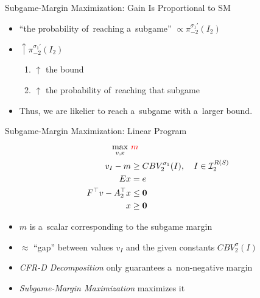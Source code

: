 \documentclass{beamer}
\theoremstyle{definition}
\newcommand{\vect}[1]{\boldsymbol{#1}}
\newcommand{\I}{\mathcal{I}}
\begin{document}
{\begin{frame}{Subgame-Margin Maximization: Gain Is Proportional to SM}
      \begin{itemize}[<+- | alert@+>]
         \item ``the probability of~reaching a~subgame'' $\propto \pi_{-2}^{\sigma_1'}(I_2)$
         \item $\uparrow \pi_{-2}^{\sigma_1'}(I_2)$
           \begin{enumerate}[$\Rightarrow$]
             \item $\uparrow$ the bound
             \item $\uparrow$ the probability of~reaching that subgame
           \end{enumerate}
         \item Thus, we are likelier to reach a~subgame with a~larger bound.
      \end{itemize}
    \end{frame}

    \begin{frame}{Subgame-Margin Maximization: Linear Program}
      \begin{equation*}
        \label{lp:max-margin}
        \begin{split}
          \max_{v, x}\ &\textcolor{red}{m} \\
          v_I - m &\ge CBV_2^{\sigma_1}(I), \quad I \in \I_2^{R(S)}\\ 
          Ex &= e \\
          F^\top v - A_2^\top x &\le \vect{0} \\
          x &\ge \vect{0}
        \end{split}
      \end{equation*}
      \pause

      \begin{itemize}[<+- | alert@+>]
        \item $m$ is a~scalar corresponding to the subgame margin
        \item $\approx$ ``gap'' between values $v_I$ and the given constants $CBV_2^\sigma(I)$
        \item \emph{CFR-D Decomposition} only guarantees a~non-negative margin
        \item \emph{Subgame-Margin Maximization} maximizes it
      \end{itemize}
    \end{frame}

}
\end{document}
